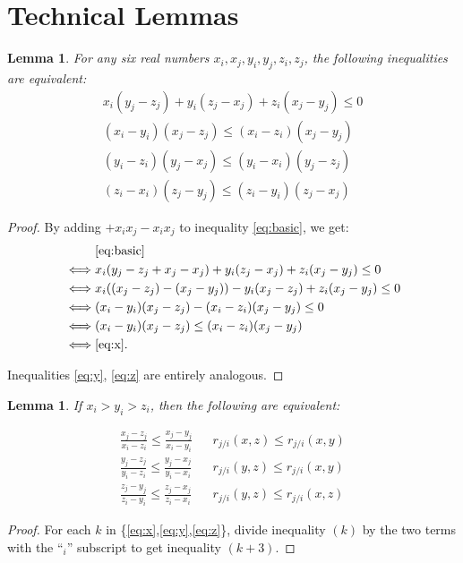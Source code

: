 \documentclass[sigconf]{aamas}
\newtheorem{lemma}[theorem]{Lemma}
\theoremstyle{definition}
\begin{document}
\section{Technical Lemmas}

\begin{lemma}
\label{lem:diffs_mul}
For any six real numbers $x_i,x_j,y_i,y_j,z_i,z_j$, the following inequalities are equivalent:
\begin{align}
\label{eq:basic}
x_i(y_j-z_j) + y_i(z_j-x_j) + z_i(x_j-y_j) \leq 0
\\
\label{eq:x}
(x_i-y_i)(x_j-z_j)
\leq
(x_i-z_i)(x_j-y_j)
\\
\label{eq:y}
(y_i-z_i)(y_j-x_j)
\leq
(y_i-x_i)(y_j-z_j)
\\
\label{eq:z}
(z_i-x_i)(z_j-y_j)
\leq
(z_i-y_i)(z_j-x_j)
\end{align}
\end{lemma}
\begin{proof}
By adding $+x_i x_j - x_i x_j$ to  inequality \eqref{eq:basic}, we get:
\begin{align*}
&
\eqref{eq:basic}
\\
\iff&
x_i(y_j-z_j+x_j-x_j) + y_i(z_j-x_j) + z_i(x_j-y_j) \leq 0
\\
\iff&
x_i((x_j-z_j)-(x_j-y_j)) 
-
y_i(x_j-z_j) 
+
z_i(x_j-y_j) 
\leq 0
\\
\iff&
(x_i-y_i)(x_j-z_j)
-
(x_i-z_i)(x_j-y_j)
\leq 0
\\
\iff&
(x_i-y_i)(x_j-z_j)
\leq
(x_i-z_i)(x_j-y_j)
\\
\iff& \eqref{eq:x}.
\end{align*}

Inequalities \eqref{eq:y}, \eqref{eq:z} are entirely analogous.
\end{proof}


\begin{lemma}
\label{lem:diffs_div}
If $x_i > y_i > z_i$, then the following are equivalent:

\begin{align}
\frac{x_j-z_j}{x_i-z_i}  
\leq
\frac{x_j-y_j}{x_i-y_i}  
&& r_{j/i}(x,z) \leq r_{j/i}(x,y)
\\
\frac{y_j-z_j}{y_i-z_i}
\leq
\frac{y_j-x_j}{y_i-x_i}
&& r_{j/i}(y,z) \leq r_{j/i}(x,y)
\\
\frac{z_j-y_j}{z_i-y_i}
\leq
\frac{z_j-x_j}{z_i-x_i}
&& r_{j/i}(y,z) \leq r_{j/i}(x,z)
\end{align}
\end{lemma}
\begin{proof}
For each $k$ in \{\ref{eq:x},\ref{eq:y},\ref{eq:z}\},
divide inequality $(k)$ by the two terms with the ``$_i$'' subscript to get inequality $(k+3)$.
\end{proof}
\end{document}
